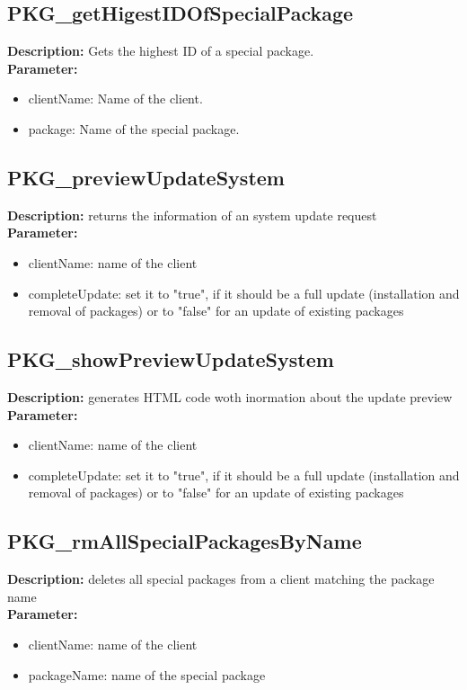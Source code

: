 \subsection{PKG\_getHigestIDOfSpecialPackage}
\textbf{Description:} Gets the highest ID of a special package.\\
\textbf{Parameter:}
\begin{itemize}
\item clientName: Name of the client.
\item package: Name of the special package.
\end{itemize}

\subsection{PKG\_previewUpdateSystem}
\textbf{Description:} returns the information of an system update request\\
\textbf{Parameter:}
\begin{itemize}
\item clientName: name of the client 
\item completeUpdate: set it to "true", if it should be a full update (installation and removal of packages) or to "false" for an update of existing packages
\end{itemize}

\subsection{PKG\_showPreviewUpdateSystem}
\textbf{Description:} generates HTML code woth inormation about the update preview\\
\textbf{Parameter:}
\begin{itemize}
\item clientName: name of the client 
\item completeUpdate: set it to "true", if it should be a full update (installation and removal of packages) or to "false" for an update of existing packages
\end{itemize}

\subsection{PKG\_rmAllSpecialPackagesByName}
\textbf{Description:} deletes all special packages from a client matching the package name\\
\textbf{Parameter:}
\begin{itemize}
\item clientName: name of the client 
\item packageName: name of the special package
\end{itemize}


